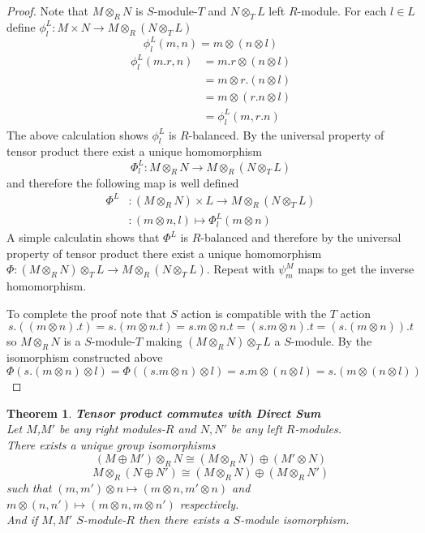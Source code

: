 \documentclass{article}
\theoremstyle{plain}
\newtheorem{thm}{Theorem}[section]
\theoremstyle{definition}
\theoremstyle{remark}
\begin{document}
  \begin{proof}
    Note that $M\otimes_RN$ is $S$-module-$T$ and $N\otimes_TL$ left $R$-module.
    For each $l\in L$ define $\phi_l^L:M\times N\to M\otimes_R(N\otimes_TL)$
    \[\phi_l^L(m,n) = m\otimes (n\otimes l)\]
    \begin{align*}
      \phi_l^L(m.r,n) &= m.r\otimes(n\otimes l) \\
      &= m\otimes r.(n\otimes l) \\
      &= m\otimes (r.n\otimes l) \\
      &= \phi_l^L(m,r.n)
    \end{align*}
    The above calculation shows $\phi_l^L$ is $R$-balanced. By the universal 
    property of tensor product there exist a unique homomorphism
    \[ \Phi_l^L:M\otimes_RN\to M\otimes_R(N\otimes_TL) \]
    and therefore the following map is well defined
    \begin{align*}
      \Phi^L&:(M\otimes_RN)\times L\to M\otimes_R(N\otimes_T L)\\
      &:(m\otimes n,l)\mapsto \Phi_l^L(m\otimes n)
    \end{align*}
    A simple calculatin shows that $\Phi^L$ is $R$-balanced and therefore by
    the universal property of tensor product there exist a unique homomorphism
    $\Phi:(M\otimes_R N)\otimes_TL\to M\otimes_R(N\otimes_TL)$. Repeat with
    $\psi_m^M$ maps to get the inverse homomorphism.

    To complete the proof note that $S$ action is compatible with the $T$ action
    \[s.((m\otimes n).t)=s.(m\otimes n.t)=s.m\otimes n.t = (s.m\otimes n).t=(s.(m\otimes n)).t \]
    so $M\otimes_RN$ is a $S$-module-$T$ making $(M\otimes_RN)\otimes_TL$ a $S$-module.
    By the isomorphism constructed above $\Phi(s.(m\otimes n)\otimes l)=\Phi((s.m\otimes n)\otimes l)=s.m\otimes(n\otimes l)=s.(m\otimes(n\otimes l))$
  \end{proof}
  \begin{thm}\textbf{Tensor product commutes with Direct Sum}\\
    Let $M$,$M'$ be any right modules-$R$ and $N,N'$ be any
    left $R$-modules.\\[1em]
    There exists a unique group isomorphisms
    \[(M\oplus M')\otimes_R N\cong(M\otimes_RN)\oplus(M'\otimes N)\]
    \[ M\otimes_R(N\oplus N')\cong(M\otimes_RN)\oplus(M\otimes_RN') \]
    such that $(m,m')\otimes n \mapsto (m\otimes n,m'\otimes n)$ and
    $m\otimes(n,n')\mapsto(m\otimes n,m\otimes n')$ respectively.
    \\[1em]
    And if $M,M'$ $S$-module-$R$ then there exists a $S$-module isomorphism.
  \end{thm}
\end{document}
